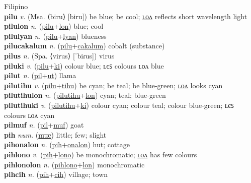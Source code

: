 Filipino \label{'pilipinastilip} \\
\textbf{pilu} \textit{v.} (Msa. ⟨biru⟩ [biru])
be blue; be cool; \hyperref[pilulon]{ʟᴏᴧ} reflects short wavelength light \label{pilu} \\
\textbf{pilulon} \textit{n.} (\hyperref[pilu]{pilu}+\hyperref[lon]{lon})
blue; cool \label{pilulon} \\
\textbf{pilulyan} \textit{n.} (\hyperref[pilu]{pilu}+\hyperref[lyan]{lyan})
blueness \label{pilulyan} \\
\textbf{pilucakalum} \textit{n.} (\hyperref[pilu]{pilu}+\hyperref[cakalum]{cakalum})
cobalt (substance) \label{pilucakalum} \\
\textbf{pilus} \textit{n.} (Spa. ⟨virus⟩ [ˈbiɾus])
virus \label{pilus} \\
\textbf{piluki} \textit{v.} (\hyperref[pilu]{pilu}+\hyperref[ki]{ki})
colour blue; ʟєꜱ colours ʟᴏᴧ blue \label{piluki} \\
\textbf{pilut} \textit{n.} (\hyperref[pil]{pil}+\hyperref[ut]{ut})
llama \label{pilut} \\
\textbf{pilutihu} \textit{v.} (\hyperref[pilu]{pilu}+\hyperref[tihu]{tihu})
be cyan; be teal; be blue-green; \hyperref[pilutihulon]{ʟᴏᴧ} looks cyan \label{pilutihu} \\
\textbf{pilutihulon} \textit{n.} (\hyperref[pilutihu]{pilutihu}+\hyperref[lon]{lon})
cyan; teal; blue-green \label{pilutihulon} \\
\textbf{pilutihuki} \textit{v.} (\hyperref[pilutihu]{pilutihu}+\hyperref[ki]{ki})
colour cyan; colour teal; colour blue-green; ʟєꜱ colours ʟᴏᴧ cyan \label{pilutihuki} \\
\textbf{pilmuf} \textit{n.} (\hyperref[pil]{pil}+\hyperref[muf]{muf})
goat \label{pilmuf} \\
\textbf{pih} \textit{num.} (\hyperref[muc]{\sout{muc}})
little; few; slight \label{pih} \\
\textbf{pihonalon} \textit{n.} (\hyperref[pih]{pih}+\hyperref[onalon]{onalon})
hut; cottage \label{pihonalon} \\
\textbf{pihlono} \textit{v.} (\hyperref[pih]{pih}+\hyperref[lono]{lono})
be monochromatic; \hyperref[pihlonolon]{ʟᴏᴧ} has few colours \label{pihlono} \\
\textbf{pihlonolon} \textit{n.} (\hyperref[pihlono]{pihlono}+\hyperref[lon]{lon})
monochromatic \label{pihlonolon} \\
\textbf{pihcih} \textit{n.} (\hyperref[pih]{pih}+\hyperref[cih]{cih})
village; town \label{pihcih} \\
